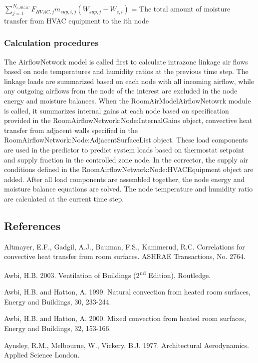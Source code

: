 {\({\sum\limits_{j = 1}^{N_{i,HVAC}} F_{HVAC,j} \dot m_{sup,i,j} \left( W_{sup,j} - W_{z,i}\right)}\) = The total amount of moisture transfer from HVAC equipment to the ith node

\subsubsection{Calculation procedures}\label{calculation-procedures}

The AirflowNetwork model is called first to calculate intrazone linkage air flows based on node temperatures and humidity ratios at the previous time step. The linkage loads are summarized based on each node with all incoming airflow, while any outgoing airflows from the node of the interest are excluded in the node energy and moisture balances. When the RoomAirModelAirflowNetowrk module is called, it summarizes internal gains at each node based on specification provided in the RoomAirflowNetwork:Node:InternalGains object, convective heat transfer from adjacent walls specified in the RoomAirflowNetwork:Node:AdjacentSurfaceList object. These load components are used in the predictor to predict system loads based on thermostat setpoint and supply fraction in the controlled zone node. In the corrector, the supply air conditions defined in the RoomAirflowNetwork:Node:HVACEquipment object are added. After all load components are assembled together, the node energy and moisture balance equations are solved. The node temperature and humidity ratio are calculated at the current time step.

\subsection{References}\label{ra-references}

Altmayer, E.F., Gadgil, A.J., Bauman, F.S., Kammerud, R.C. Correlations for convective heat transfer from room surfaces. ASHRAE Transactions, No. 2764.

Awbi, H.B. 2003. Ventilation of Buildings (2\textsuperscript{nd} Edition). Routledge.

Awbi, H.B. and Hatton, A. 1999. Natural convection from heated room surfaces, Energy and Buildings, 30, 233-244.

Awbi, H.B. and Hatton, A. 2000. Mixed convection from heated room surfaces, Energy and Buildings, 32, 153-166.

Aynsley, R.M., Melbourne, W., Vickery, B.J. 1977. Architectural Aerodynamics. Applied Science London.

}

